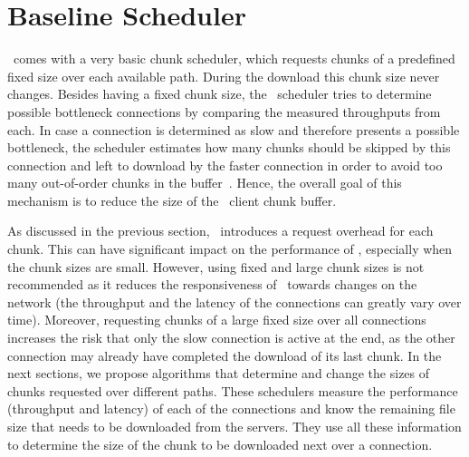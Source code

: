 \section{Baseline Scheduler}
\label{sec:baseline-scheduler}

\protoold~comes with a very basic chunk scheduler, which requests chunks of a predefined fixed size over each available path. 
During the download this chunk size never changes. 
Besides having a fixed chunk size, the \algbase~scheduler tries to determine possible bottleneck connections by comparing the measured throughputs from each.
In case a connection is determined as slow and therefore presents a possible bottleneck, the scheduler estimates how many chunks should be skipped by this connection and left to download by the faster connection in order to avoid too many out-of-order chunks in the buffer~\cite{KIM13-MHTTP}.
Hence, the overall goal of this mechanism is to reduce the size of the \mhttp~client chunk buffer. 


As discussed in the previous section, \mhttp~introduces a request overhead for each chunk. 
This can have significant impact on the performance of \mhttp, especially when the chunk sizes are small. 
However, using fixed and large chunk sizes is not recommended as it reduces the responsiveness of \mhttp~towards changes on the network (\eg the throughput and the latency of the connections can greatly vary over time). 
Moreover, requesting chunks of a large fixed size over all connections increases the risk that only the slow connection is active at the end, as the other connection may already have completed the download of its last chunk. 
In the next sections, we propose algorithms that determine and change the sizes of chunks requested over different paths. 
These schedulers measure the performance (\ie throughput and latency) of each of the connections and know the remaining file size that needs to be downloaded from the servers. 
They use all these information to determine the size of the chunk to be downloaded next over a connection.
